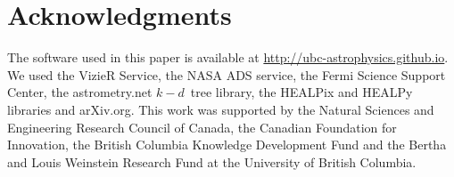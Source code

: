 \documentclass[useAMS,usenatbib]{mn2e}
\begin{document}
\section*{Acknowledgments}

The software used in this paper is available at
\url{http://ubc-astrophysics.github.io}.  We used the VizieR Service,
the NASA ADS service, the Fermi Science Support Center, the astrometry.net
$k-d$~tree library, the HEALPix and HEALPy libraries and arXiv.org. This work
was supported by the Natural Sciences and Engineering Research Council
of Canada, the Canadian Foundation for Innovation, the British
Columbia Knowledge Development Fund and the Bertha and Louis Weinstein
Research Fund at the University of British Columbia.





\label{lastpage}
\end{document}
